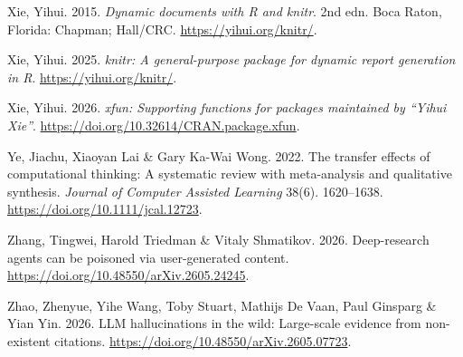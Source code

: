 \documentclass[
  letterpaper,
  DIV=11,
  numbers=noendperiod]{scrreprt}
\newlength{\cslhangindent}
\newenvironment{CSLReferences}[2] %
 {\begin{list}{}{%
  \setlength{\itemindent}{0pt}
  \setlength{\leftmargin}{0pt}
  \setlength{\parsep}{0pt}
  \ifodd #1
   \setlength{\leftmargin}{\cslhangindent}
   \setlength{\itemindent}{-1\cslhangindent}
  \fi
  \setlength{\itemsep}{#2\baselineskip}}}
 {\end{list}}
\begin{document}
\begin{CSLReferences}{1}{0}
Xie, Yihui. 2015. \emph{Dynamic documents with {R} and knitr}. 2nd edn.
Boca Raton, Florida: Chapman; Hall/CRC. \url{https://yihui.org/knitr/}.

Xie, Yihui. 2025. \emph{{knitr}: A general-purpose package for dynamic
report generation in {R}}. \url{https://yihui.org/knitr/}.

Xie, Yihui. 2026. \emph{{xfun}: Supporting functions for packages
maintained by {``{Yihui Xie}''}}.
\url{https://doi.org/10.32614/CRAN.package.xfun}.

Ye, Jiachu, Xiaoyan Lai \& Gary Ka-Wai Wong. 2022. The transfer effects
of computational thinking: A systematic review with meta-analysis and
qualitative synthesis. \emph{Journal of Computer Assisted Learning}
38(6). 1620--1638. \url{https://doi.org/10.1111/jcal.12723}.

Zhang, Tingwei, Harold Triedman \& Vitaly Shmatikov. 2026. Deep-research
agents can be poisoned via user-generated content.
\url{https://doi.org/10.48550/arXiv.2605.24245}.

Zhao, Zhenyue, Yihe Wang, Toby Stuart, Mathijs De Vaan, Paul Ginsparg \&
Yian Yin. 2026. LLM hallucinations in the wild: Large-scale evidence
from non-existent citations.
\url{https://doi.org/10.48550/arXiv.2605.07723}.

\end{CSLReferences}
\end{document}

